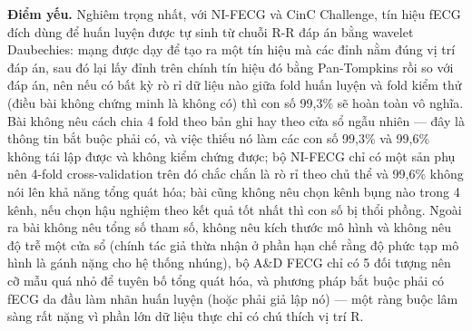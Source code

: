 \documentclass[12pt,a4paper]{article}
\begin{document}
\noindent \textbf{Điểm yếu.} Nghiêm trọng nhất, với NI-FECG và CinC Challenge, tín hiệu fECG đích dùng để huấn luyện được tự sinh từ chuỗi R-R đáp án bằng wavelet Daubechies: mạng được dạy để tạo ra một tín hiệu mà các đỉnh nằm đúng vị trí đáp án, sau đó lại lấy đỉnh trên chính tín hiệu đó bằng Pan-Tompkins rồi so với đáp án, nên nếu có bất kỳ rò rỉ dữ liệu nào giữa fold huấn luyện và fold kiểm thử (điều bài không chứng minh là không có) thì con số 99,3\% sẽ hoàn toàn vô nghĩa. Bài không nêu cách chia 4 fold theo bản ghi hay theo cửa sổ ngẫu nhiên — đây là thông tin bắt buộc phải có, và việc thiếu nó làm các con số 99,3\% và 99,6\% không tái lập được và không kiểm chứng được; bộ NI-FECG chỉ có một sản phụ nên 4-fold cross-validation trên đó chắc chắn là rò rỉ theo chủ thể và 99,6\% không nói lên khả năng tổng quát hóa; bài cũng không nêu chọn kênh bụng nào trong 4 kênh, nếu chọn hậu nghiệm theo kết quả tốt nhất thì con số bị thổi phồng. Ngoài ra bài không nêu tổng số tham số, không nêu kích thước mô hình và không nêu độ trễ một cửa sổ (chính tác giả thừa nhận ở phần hạn chế rằng độ phức tạp mô hình là gánh nặng cho hệ thống nhúng), bộ A\&D FECG chỉ có 5 đối tượng nên cỡ mẫu quá nhỏ để tuyên bố tổng quát hóa, và phương pháp bắt buộc phải có fECG da đầu làm nhãn huấn luyện (hoặc phải giả lập nó) — một ràng buộc lâm sàng rất nặng vì phần lớn dữ liệu thực chỉ có chú thích vị trí R.\par\vspace{3pt}
\end{document}
